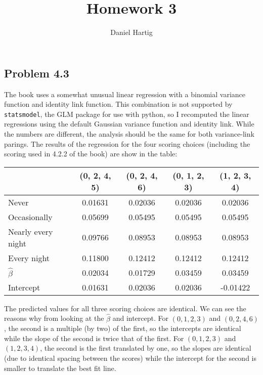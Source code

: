 \documentclass{article}
\title{Homework 3}
\author{Daniel Hartig}
\begin{document}
\maketitle

\titlespacing{\subsection}{0pt}{0pt}{0pt}
\titlespacing{\subsubsection}{0pt}{0pt}{-\parskip}

\subsection{Problem 4.3}
The book uses a somewhat unusual linear regression with a binomial variance function and identity link function. This combination is not supported by {\tt statsmodel}, the GLM package for use with python, so I recomputed the linear regressions using the default Gaussian variance function and identity link. While the numbers are different, the analysis should be the same for both variance-link parings. The results of the regression for the four scoring choices (including the scoring used in 4.2.2 of the book) are show in the table:

\begin{center}
\begin{tabular}{l c c c c}
&(0, 2, 4, 5)&(0, 2, 4, 6)&(0, 1, 2, 3)&(1, 2, 3, 4) \\\hline
Never&0.01631&0.02036&0.02036&0.02036 \\ 
Occasionally&0.05699&0.05495&0.05495&0.05495 \\
Nearly every night&0.09766&0.08953&0.08953&0.08953 \\ 
Every night&0.11800&0.12412&0.12412&0.12412\\\hline
$\hat{\beta}$&0.02034&0.01729&0.03459&0.03459 \\
Intercept&0.01631&0.02036&0.02036&-0.01422
\end{tabular}
\end{center}

The predicted values for all three scoring choices are identical. We can see the reasons why from looking at the $\hat{\beta}$ and intercept. For $(0, 1, 2, 3)$ and $(0, 2, 4, 6)$, the second is a multiple (by two) of the first, so the intercepts are identical while the slope of the second is twice that of the first. For $(0, 1, 2, 3)$ and $(1, 2, 3, 4)$, the second is the first translated by one, so the slopes are identical (due to identical spacing between the scores) while the intercept for the second is smaller to translate the best fit line.
\end{document}

